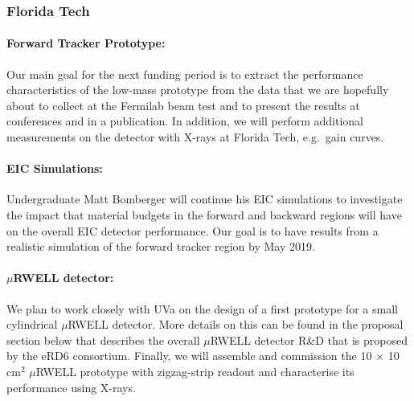 \subsubsection{Florida Tech} 
\paragraph*{Forward Tracker Prototype:} Our main goal for the next funding period is to extract the performance characteristics of the low-mass prototype from the data that we are hopefully about to collect at the Fermilab beam test and to present the results at conferences and in a publication. In addition, we will perform additional measurements on the detector with X-rays at Florida Tech, e.g.\ gain curves.
%
\paragraph*{EIC Simulations:} Undergraduate Matt Bomberger will continue his EIC simulations to investigate the impact that material budgets in the forward and backward regions will have on the overall EIC detector performance. Our goal is to have results from a realistic simulation of the forward tracker region by May 2019.
%
\paragraph*{$\mu$RWELL detector:} We plan to work closely with UVa on the design of a first prototype for a small cylindrical $\mu$RWELL detector. More details on this can be found in the proposal section below that describes the overall $\mu$RWELL detector R\&D that is proposed by the eRD6 consortium. Finally, we will assemble and commission the 10 $\times$ 10 cm$^2$ $\mu$RWELL prototype with zigzag-strip readout and characterise its performance using X-rays.

